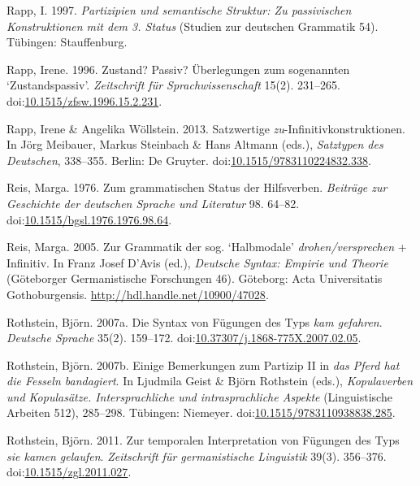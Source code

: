 \leavevmode{}%
Rapp, I. 1997. \emph{Partizipien und semantische {Struktur}: Zu
passivischen {Konstruktionen} mit dem 3. {Status}} (Studien {zur}
{deutschen} Grammatik 54). Tübingen: Stauffenburg.

\leavevmode{}%
Rapp, Irene. 1996. Zustand? {Passiv}? {Überlegungen} zum sogenannten
{`{Zustandspassiv}'}. \emph{Zeitschrift für Sprachwissenschaft} 15(2).
231--265.
doi:\href{https://doi.org/10.1515/zfsw.1996.15.2.231}{10.1515/zfsw.1996.15.2.231}.

\leavevmode{}%
Rapp, Irene \& Angelika Wöllstein. 2013. Satzwertige
\emph{zu}-{Infinitivkonstruktionen}. In Jörg Meibauer, Markus Steinbach
\& Hans Altmann (eds.), \emph{Satztypen des {Deutschen}}, 338--355.
Berlin: De Gruyter.
doi:\href{https://doi.org/10.1515/9783110224832.338}{10.1515/9783110224832.338}.

\leavevmode{}%
Reis, Marga. 1976. Zum grammatischen {Status} der {Hilfsverben}.
\emph{Beiträge zur Geschichte der deutschen Sprache und Literatur} 98.
64--82.
doi:\href{https://doi.org/10.1515/bgsl.1976.1976.98.64}{10.1515/bgsl.1976.1976.98.64}.

\leavevmode{}%
Reis, Marga. 2005. Zur {Grammatik} der sog. {`{Halbmodale}'}
\emph{drohen/versprechen} + {Infinitiv}. In Franz Josef D'Avis (ed.),
\emph{{Deutsche Syntax: Empirie und Theorie}} (Göteborger Germanistische
Forschungen 46). Göteborg: Acta Universitatis Gothoburgensis.
\url{http://hdl.handle.net/10900/47028}.

\leavevmode{}%
Rothstein, Björn. 2007a. Die {Syntax} von {Fügungen} des {Typs}
\emph{kam gefahren}. \emph{Deutsche Sprache} 35(2). 159--172.
doi:\href{https://doi.org/10.37307/j.1868-775X.2007.02.05}{10.37307/j.1868-775X.2007.02.05}.

\leavevmode{}%
Rothstein, Björn. 2007b. Einige {Bemerkungen} zum {Partizip II} in
\emph{das {Pferd} hat die {Fesseln} bandagiert}. In Ljudmila Geist \&
Björn Rothstein (eds.), \emph{Kopulaverben und {Kopulasätze}.
{Intersprachliche} und intrasprachliche {Aspekte}} (Linguistische
Arbeiten 512), 285--298. Tübingen: Niemeyer.
doi:\href{https://doi.org/10.1515/9783110938838.285}{10.1515/9783110938838.285}.

\leavevmode{}%
Rothstein, Björn. 2011. Zur temporalen {Interpretation} von {Fügungen}
des {Typs} \emph{sie kamen gelaufen}. \emph{Zeitschrift für
germanistische Linguistik} 39(3). 356--376.
doi:\href{https://doi.org/10.1515/zgl.2011.027}{10.1515/zgl.2011.027}.

